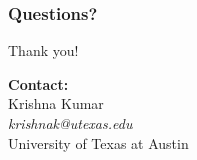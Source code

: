 \documentclass[notes]{beamer}
\begin{document}
\begin{frame}
\frametitle{Questions?}

\centering
\Large Thank you!

\vspace{2cm}

\textbf{Contact:} \\
Krishna Kumar \\
\textit{krishnak@utexas.edu} \\
University of Texas at Austin

\end{frame}
\end{document}

